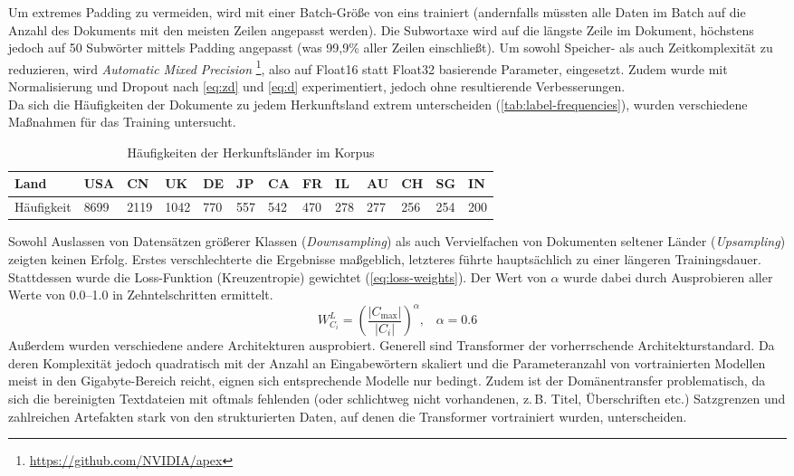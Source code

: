 \documentclass[bachelor,german]{info1thesis}
\begin{document}
Um extremes Padding zu vermeiden, wird mit einer Batch-Größe von eins trainiert (andernfalls müssten alle Daten im Batch auf die Anzahl des Dokuments mit den meisten Zeilen angepasst werden). Die Subwortaxe wird auf die längste Zeile im Dokument, höchstens jedoch auf 50 Subwörter mittels Padding angepasst (was 99,9\% aller Zeilen einschließt). Um sowohl Speicher- als auch Zeitkomplexität zu reduzieren, wird \textit{Automatic Mixed Precision} \footnote{\url{https://github.com/NVIDIA/apex}}, also auf Float16 statt Float32 basierende Parameter, eingesetzt.
Zudem wurde mit Normalisierung und Dropout nach \autoref{eq:zd} und \ref{eq:d} experimentiert, jedoch ohne resultierende Verbesserungen. \\
Da sich die Häufigkeiten der Dokumente zu jedem Herkunftsland extrem unterscheiden (\autoref{tab:label-frequencies}), wurden verschiedene Maßnahmen für das Training untersucht.
%
\begin{table}[h!]
\begin{tabular}{@{}lllllllllllll@{}}
Land       & USA  & CN   & UK   & DE  & JP  & CA  & FR  & IL  & AU  & CH  & SG  & IN  \\ \midrule
Häufigkeit & 8699 & 2119 & 1042 & 770 & 557 & 542 & 470 & 278 & 277 & 256 & 254 & 200 \\ %
\end{tabular}
\caption{Häufigkeiten der Herkunftsländer im Korpus}
\label{tab:label-frequencies}
\end{table}
%
Sowohl Auslassen von Datensätzen größerer Klassen (\textit{Downsampling}) als auch Vervielfachen von Dokumenten seltener Länder (\textit{Upsampling}) zeigten keinen Erfolg. Erstes verschlechterte die Ergebnisse maßgeblich, letzteres führte hauptsächlich zu einer längeren Trainingsdauer. Stattdessen wurde die Loss-Funktion (Kreuzentropie) gewichtet (\autoref{eq:loss-weights}). Der Wert von $\alpha$ wurde dabei durch Ausprobieren aller Werte von 0.0--1.0 in Zehntelschritten ermittelt.
%
\begin{equation}
W_{C_i}^L = \left(\frac{|C_{\max}|}{|C_i|}\right)^\alpha,\;\;\;\alpha = 0.6 \label{eq:loss-weights}
\end{equation}
%
\newpage
\noindent Außerdem wurden verschiedene andere Architekturen ausprobiert. Generell sind Transformer der vorherrschende Architekturstandard. Da deren Komplexität jedoch quadratisch mit der Anzahl an Eingabewörtern skaliert und die Parameteranzahl von vortrainierten Modellen meist in den Gigabyte-Bereich reicht, eignen sich entsprechende Modelle nur bedingt. Zudem ist der Domänentransfer problematisch, da sich die bereinigten Textdateien mit oftmals fehlenden (oder schlichtweg nicht vorhandenen, z.\,B. Titel, Überschriften etc.) Satzgrenzen und zahlreichen Artefakten stark von den strukturierten Daten, auf denen die Transformer vortrainiert wurden, unterscheiden.
\end{document}

